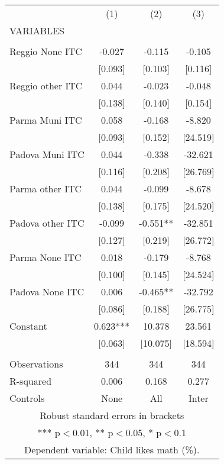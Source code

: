 \begin{tabular}{lccc} \hline
 & (1) & (2) & (3) \\
VARIABLES &  &  &  \\ \hline
 &  &  &  \\
Reggio None ITC & -0.027 & -0.115 & -0.105 \\
 & [0.093] & [0.103] & [0.116] \\
Reggio other ITC & 0.044 & -0.023 & -0.048 \\
 & [0.138] & [0.140] & [0.154] \\
Parma Muni ITC & 0.058 & -0.168 & -8.820 \\
 & [0.093] & [0.152] & [24.519] \\
Padova Muni ITC & 0.044 & -0.338 & -32.621 \\
 & [0.116] & [0.208] & [26.769] \\
Parma other ITC & 0.044 & -0.099 & -8.678 \\
 & [0.138] & [0.175] & [24.520] \\
Padova other ITC & -0.099 & -0.551** & -32.851 \\
 & [0.127] & [0.219] & [26.772] \\
Parma None ITC & 0.018 & -0.179 & -8.768 \\
 & [0.100] & [0.145] & [24.524] \\
Padova None ITC & 0.006 & -0.465** & -32.792 \\
 & [0.086] & [0.188] & [26.775] \\
Constant & 0.623*** & 10.378 & 23.561 \\
 & [0.063] & [10.075] & [18.594] \\
 &  &  &  \\
Observations & 344 & 344 & 344 \\
R-squared & 0.006 & 0.168 & 0.277 \\
 Controls & None & All & Inter \\ \hline
\multicolumn{4}{c}{ Robust standard errors in brackets} \\
\multicolumn{4}{c}{ *** p$<$0.01, ** p$<$0.05, * p$<$0.1} \\
\multicolumn{4}{c}{ Dependent variable: Child likes math (\%).} \\
\end{tabular}
